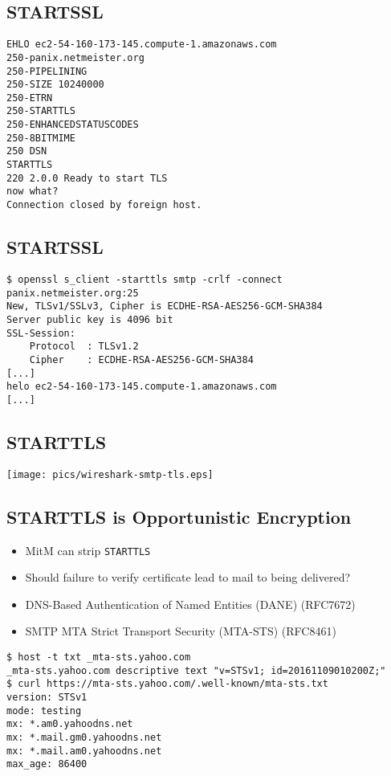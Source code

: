 \documentclass[xga]{xdvislides}
\begin{document}
\subsection{STARTSSL}
\begin{verbatim}
EHLO ec2-54-160-173-145.compute-1.amazonaws.com
250-panix.netmeister.org
250-PIPELINING
250-SIZE 10240000
250-ETRN
250-STARTTLS
250-ENHANCEDSTATUSCODES
250-8BITMIME
250 DSN
STARTTLS
220 2.0.0 Ready to start TLS
now what?
Connection closed by foreign host.
\end{verbatim}

\subsection{STARTSSL}
\begin{verbatim}
$ openssl s_client -starttls smtp -crlf -connect panix.netmeister.org:25
New, TLSv1/SSLv3, Cipher is ECDHE-RSA-AES256-GCM-SHA384
Server public key is 4096 bit
SSL-Session:
    Protocol  : TLSv1.2
    Cipher    : ECDHE-RSA-AES256-GCM-SHA384
[...]
helo ec2-54-160-173-145.compute-1.amazonaws.com
[...]
\end{verbatim}

\subsection{STARTTLS}
\begin{center}
	\texttt{[image: pics/wireshark-smtp-tls.eps]}
\end{center}

\subsection{STARTTLS is Opportunistic Encryption}
\begin{itemize}
	\item MitM can strip \verb+STARTTLS+
	\item Should failure to verify certificate lead to mail to being delivered?
	\item DNS-Based Authentication of Named Entities (DANE) (RFC7672)
	\item SMTP MTA Strict Transport Security (MTA-STS) (RFC8461)
\end{itemize}

\begin{verbatim}
$ host -t txt _mta-sts.yahoo.com
_mta-sts.yahoo.com descriptive text "v=STSv1; id=20161109010200Z;"
$ curl https://mta-sts.yahoo.com/.well-known/mta-sts.txt
version: STSv1
mode: testing
mx: *.am0.yahoodns.net
mx: *.mail.gm0.yahoodns.net
mx: *.mail.am0.yahoodns.net
max_age: 86400
\end{verbatim}
\end{document}
